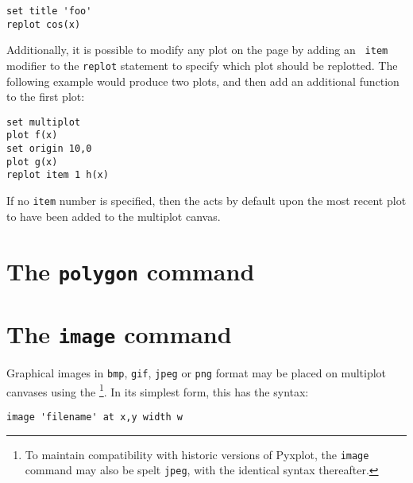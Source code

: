 \begin{verbatim}
set title 'foo'
replot cos(x)
\end{verbatim}

Additionally, it is possible to modify any plot on the page by adding an {\tt
item} modifier to the {\tt replot} statement to specify which plot should be
replotted.  The following example would produce two plots, and then add an
additional function to the first plot:

\begin{verbatim}
set multiplot
plot f(x)
set origin 10,0
plot g(x)
replot item 1 h(x)
\end{verbatim}

If no {\tt item} number is specified, then the  acts by default
upon the most recent plot to have been added to the multiplot canvas.

\section{The {\tt polygon} command}



\section{The {\tt image} command}

Graphical images in {\tt bmp}, {\tt gif}, {\tt jpeg} or {\tt png} format may be
placed on multiplot canvases using the \footnote{To maintain
compatibility with historic versions of Pyxplot, the {\tt image} command may
also be spelt {\tt jpeg}, with the identical syntax thereafter.}. In its
simplest form, this has the syntax:
\begin{verbatim}
image 'filename' at x,y width w
\end{verbatim}

